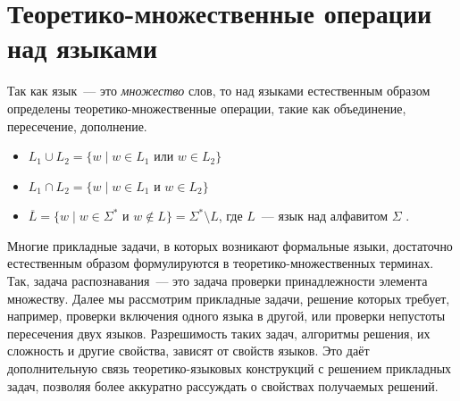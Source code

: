 \section{Теоретико-множественные операции над языками}
\label{sec:SetOperations}

Так как язык~--- это \emph{множество} слов, то над языками естественным образом определены теоретико-множественные операции, такие как объединение, пересечение, дополнение.
\begin{itemize}
    \item $L_1 \cup L_2 = \{ w \mid w \in L_1 \text{ или } w \in L_2\}$
    \item $L_1 \cap L_2 = \{ w \mid w \in L_1 \text{ и } w \in L_2\}$
    \item $\overline{L} = \{ w \mid w \in \Sigma^* \text{ и } w \notin L\} = \Sigma^* \setminus L$, где $L$~--- язык над алфавитом $\Sigma$ .
\end{itemize}

Многие прикладные задачи, в которых возникают формальные языки, достаточно естественным образом формулируются в теоретико-множественных терминах.
Так, задача распознавания~--- это задача проверки принадлежности элемента множеству.
Далее мы рассмотрим прикладные задачи, решение которых требует, например, проверки включения одного языка в другой, или проверки непустоты пересечения двух языков.
Разрешимость таких задач, алгоритмы решения, их сложность и другие свойства, зависят от свойств языков.
Это даёт дополнительную связь теоретико-языковых конструкций с решением прикладных задач, позволяя более аккуратно рассуждать о свойствах получаемых решений.
